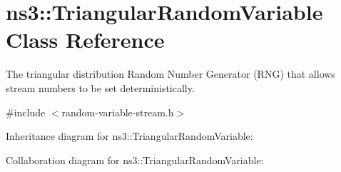 \hypertarget{classns3_1_1TriangularRandomVariable}{}\section{ns3\+:\+:Triangular\+Random\+Variable Class Reference}
\label{classns3_1_1TriangularRandomVariable}


The triangular distribution Random Number Generator (R\+NG) that allows stream numbers to be set deterministically.  




{\ttfamily \#include $<$random-\/variable-\/stream.\+h$>$}



Inheritance diagram for ns3\+:\+:Triangular\+Random\+Variable\+:


Collaboration diagram for ns3\+:\+:Triangular\+Random\+Variable\+:
